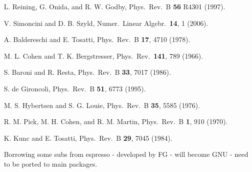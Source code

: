 \documentclass[twocolumn,prb,showpacs,superscriptaddress]{revtex4}
\begin{document}
\begin{thebibliography}{99}
L. Reining, G. Onida, and R. W. Godby, 
Phys.\ Rev.\ B {\bf 56} R4301 (1997).

V. Simoncini and D. B. Szyld,
Numer.\ Linear Algebr.\ {\bf 14}, 1 (2006).

A. Baldereschi and E. Tosatti,
Phys.\ Rev.\ B {\bf 17}, 4710 (1978).

M. L. Cohen and T. K. Bergstresser,
Phys.\ Rev.\ {\bf 141}, 789 (1966).

S. Baroni and R. Resta,
Phys.\ Rev.\ B {\bf 33}, 7017 (1986).

S. de Gironcoli,
Phys.\ Rev.\ B {\bf 51}, 6773 (1995).

M. S. Hybertsen and S. G. Louie,
Phys.\ Rev.\ B {\bf 35}, 5585 (1976).

R. M. Pick, M. H. Cohen, and R. M. Martin,
Phys.\ Rev.\ B {\bf 1}, 910 (1970). 

K. Kunc and E. Tosatti,
Phys.\ Rev.\ B {\bf 29}, 7045 (1984).

Borrowing some subs from espresso - developed by FG - will become
GNU - need to be ported to main packages.

\end{thebibliography}
\end{document}
